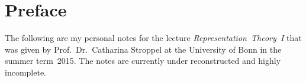 \chapter{Preface}

The following are my personal notes for the lecture \emph{Representation~Theory~I} that was given by Prof.\ Dr.\ Catharina Stroppel at the University of Bonn in the summer term~2015.
The notes are currently under reconstructed and highly incomplete.
